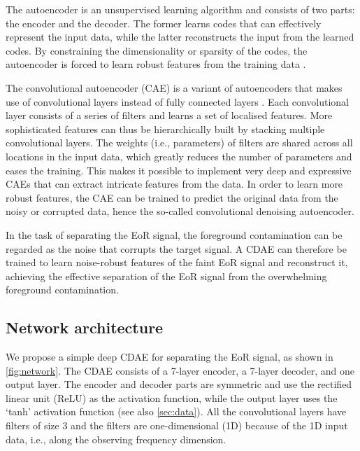 \documentclass[letters,a4paper,fleqn,usenatbib]{mnras}
\begin{document}
The autoencoder is an unsupervised learning algorithm and consists of
two parts: the encoder and the decoder.
The former learns codes that can effectively represent the input data,
while the latter reconstructs the input from the learned codes.
By constraining the dimensionality or sparsity of the codes, the
autoencoder is forced to learn robust features from the training data
\citep[chapter 14]{goodfellow2016}.

The convolutional autoencoder (CAE) is a variant of autoencoders that
makes use of convolutional layers instead of fully connected layers
\citep{masci2011}.
Each convolutional layer consists of a series of filters and learns
a set of localised features.
More sophisticated features can thus be hierarchically built by stacking
multiple convolutional layers.
The weights (i.e., parameters) of filters are shared across all
locations in the input data, which greatly reduces the number of
parameters and eases the training.
This makes it possible to implement very deep and expressive CAEs that
can extract intricate features from the data.
In order to learn more robust features, the CAE can be trained to
predict the original data from the noisy or corrupted data, hence the
so-called convolutional denoising autoencoder.

In the task of separating the EoR signal, the foreground contamination
can be regarded as the noise that corrupts the target signal.
A CDAE can therefore be trained to learn noise-robust features of the
faint EoR signal and reconstruct it, achieving the effective separation
of the EoR signal from the overwhelming foreground contamination.


\subsection{Network architecture}
\label{sec:architecture}

We propose a simple deep CDAE for separating the EoR signal, as shown
in \autoref{fig:network}.
The CDAE consists of a 7-layer encoder, a 7-layer decoder,
and one output layer.
The encoder and decoder parts are symmetric and use the rectified
linear unit (ReLU) as the activation function, while the output layer
uses the `tanh' activation function (see also \autoref{sec:data}).
All the convolutional layers have filters of size 3 and the filters
are one-dimensional (1D) because of the 1D input data, i.e., along the
observing frequency dimension.
\end{document}
